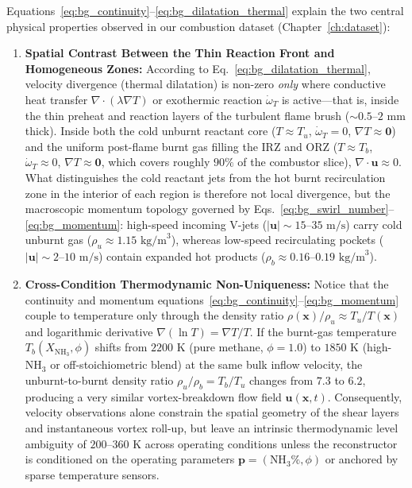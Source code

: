Equations~\eqref{eq:bg_continuity}--\eqref{eq:bg_dilatation_thermal} explain the two central physical properties observed in our combustion dataset (Chapter~\ref{ch:dataset}):
\begin{enumerate}
    \item \textbf{Spatial Contrast Between the Thin Reaction Front and Homogeneous Zones:} According to Eq.~\eqref{eq:bg_dilatation_thermal}, velocity divergence (thermal dilatation) is non-zero \emph{only} where conductive heat transfer $\nabla \cdot (\lambda \nabla T)$ or exothermic reaction $\dot{\omega}_T$ is active---that is, inside the thin preheat and reaction layers of the turbulent flame brush ($\sim 0.5\text{--}2\text{ mm}$ thick). Inside both the cold unburnt reactant core ($T \approx T_u$, $\dot{\omega}_T = 0$, $\nabla T \approx \mathbf{0}$) and the uniform post-flame burnt gas filling the IRZ and ORZ ($T \approx T_b$, $\dot{\omega}_T \approx 0$, $\nabla T \approx \mathbf{0}$, which covers roughly $90\%$ of the combustor slice), $\nabla \cdot \mathbf{u} \approx 0$. What distinguishes the cold reactant jets from the hot burnt recirculation zone in the interior of each region is therefore not local divergence, but the macroscopic momentum topology governed by Eqs.~\eqref{eq:bg_swirl_number}--\eqref{eq:bg_momentum}: high-speed incoming V-jets ($|\mathbf{u}| \sim 15\text{--}35\text{ m/s}$) carry cold unburnt gas ($\rho_u \approx 1.15\text{ kg/m}^3$), whereas low-speed recirculating pockets ($|\mathbf{u}| \sim 2\text{--}10\text{ m/s}$) contain expanded hot products ($\rho_b \approx 0.16\text{--}0.19\text{ kg/m}^3$).
    \item \textbf{Cross-Condition Thermodynamic Non-Uniqueness:} Notice that the continuity and momentum equations~\eqref{eq:bg_continuity}--\eqref{eq:bg_momentum} couple to temperature only through the density ratio $\rho(\mathbf{x})/\rho_u \approx T_u / T(\mathbf{x})$ and logarithmic derivative $\nabla (\ln T) = \nabla T / T$. If the burnt-gas temperature $T_b(X_{\text{NH}_3}, \phi)$ shifts from $2200\text{ K}$ (pure methane, $\phi=1.0$) to $1850\text{ K}$ (high-$\text{NH}_3$ or off-stoichiometric blend) at the same bulk inflow velocity, the unburnt-to-burnt density ratio $\rho_u/\rho_b = T_b/T_u$ changes from $7.3$ to $6.2$, producing a very similar vortex-breakdown flow field $\mathbf{u}(\mathbf{x}, t)$. Consequently, velocity observations alone constrain the spatial geometry of the shear layers and instantaneous vortex roll-up, but leave an intrinsic thermodynamic level ambiguity of $200\text{--}360\text{ K}$ across operating conditions unless the reconstructor is conditioned on the operating parameters $\mathbf{p} = (\text{NH}_3\%, \phi)$ or anchored by sparse temperature sensors.
\end{enumerate}

